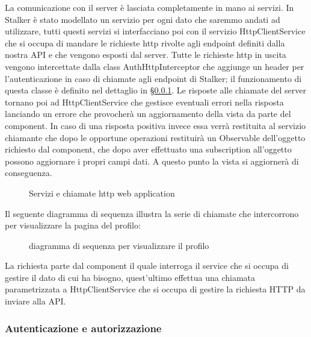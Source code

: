 \documentclass[../../manuale-manutentore.tex]{subfiles}
\begin{document}
La comunicazione con il server è lasciata completamente in mano ai servizi.
In Stalker è stato modellato un servizio per ogni dato che saremmo andati ad utilizzare, tutti questi servizi si interfacciano poi con il servizio HttpClientService che si occupa di mandare le richieste http rivolte agli endpoint definiti dalla nostra API e che vengono esposti dal server.
Tutte le richieste http in uscita vengono intercettate dalla class AuthHttpInterceptor che aggiunge un header per l'autenticazione in caso di chiamate agli endpoint di Stalker; il funzionamento di questa classe è definito nel dettaglio in §\ref{subs:autenticazione}.
Le risposte alle chiamate del server tornano poi ad HttpClientService che gestisce eventuali errori nella risposta lanciando un errore che provocherà un aggiornamento della vista da parte del component. In caso di una risposta positiva invece essa verrà restituita al servizio chiamante che dopo le opportune operazioni restituirà un Observable dell'oggetto richiesto dal component, che dopo aver effettuato una subscription all'oggetto possono aggiornare i propri campi dati.
A questo punto la vista si aggiornerà di conseguenza.

\begin{figure}[H]
  \centering
  \caption{Servizi e chiamate http web application}%
  \label{fig:web-app-http-calls}
\end{figure}

Il seguente diagramma di sequenza illustra la serie di chiamate che intercorrono per visualizzare la pagina del profilo:
\begin{figure}[H]
  \centering
  \caption{diagramma di sequenza per visualizzare il profilo}%
  \label{fig:web-app-http-call-sequence}
\end{figure}
La richiesta parte dal component il quale interroga il service che si occupa di gestire il dato di cui ha bisogno, quest'ultimo effettua una chiamata parametrizzata a HttpClientService che si occupa di gestire la richiesta HTTP da inviare alla API\@.

\subsubsection{Autenticazione e autorizzazione}%
\label{subs:autenticazione}
\end{document}
